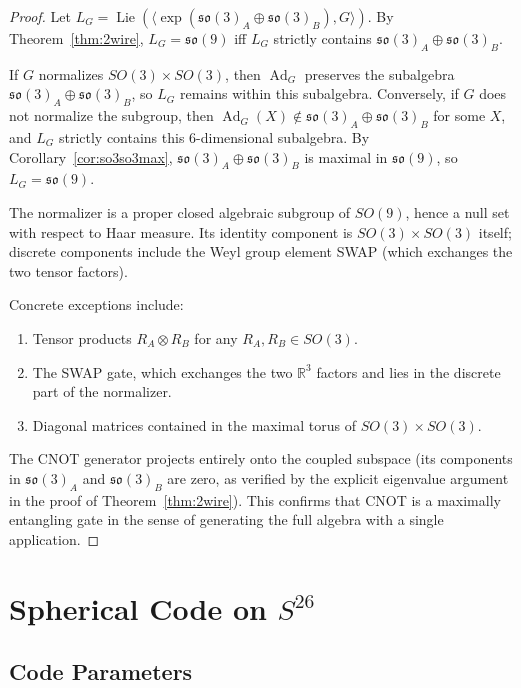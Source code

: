 \documentclass[12pt,a4paper]{article}
\newcommand{\Ad}{\operatorname{Ad}}
\newcommand{\Lie}{\operatorname{Lie}}
\begin{document}
\begin{proof}
Let $L_G = \Lie(\langle \exp(\mathfrak{so}(3)_A\oplus\mathfrak{so}(3)_B),
G \rangle)$. By Theorem~\ref{thm:2wire}, $L_G = \mathfrak{so}(9)$ iff
$L_G$ strictly contains $\mathfrak{so}(3)_A\oplus\mathfrak{so}(3)_B$.

If $G$ normalizes $SO(3)\times SO(3)$, then $\Ad_G$ preserves the
subalgebra $\mathfrak{so}(3)_A\oplus\mathfrak{so}(3)_B$, so $L_G$
remains within this subalgebra. Conversely, if $G$ does not normalize
the subgroup, then $\Ad_G(X) \notin \mathfrak{so}(3)_A\oplus
\mathfrak{so}(3)_B$ for some $X$, and $L_G$ strictly contains this
$6$-dimensional subalgebra. By Corollary~\ref{cor:so3so3max},
$\mathfrak{so}(3)_A\oplus\mathfrak{so}(3)_B$ is maximal in
$\mathfrak{so}(9)$, so $L_G = \mathfrak{so}(9)$.

The normalizer is a proper closed algebraic subgroup of $SO(9)$,
hence a null set with respect to Haar measure. Its identity component
is $SO(3)\times SO(3)$ itself; discrete components include the Weyl
group element SWAP (which exchanges the two tensor factors).

Concrete exceptions include:
\begin{enumerate}
\item Tensor products $R_A \otimes R_B$ for any $R_A,R_B \in SO(3)$.
\item The SWAP gate, which exchanges the two $\mathbb{R}^3$ factors
and lies in the discrete part of the normalizer.
\item Diagonal matrices contained in the maximal torus of
$SO(3)\times SO(3)$.
\end{enumerate}

The CNOT generator projects entirely onto the coupled subspace (its
components in $\mathfrak{so}(3)_A$ and $\mathfrak{so}(3)_B$ are zero,
as verified by the explicit eigenvalue argument in the proof of
Theorem~\ref{thm:2wire}). This confirms that CNOT is a maximally
entangling gate in the sense of generating the full algebra with
a single application.
\end{proof}

\section{Spherical Code on $S^{26}$}

\subsection{Code Parameters}
\end{document}
